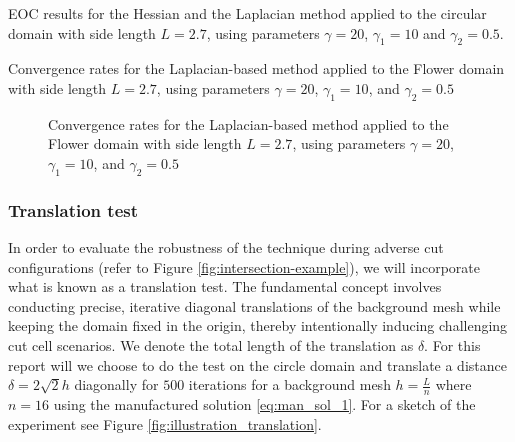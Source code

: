 \begin{table}

\begin{minipage}{1.0\textwidth}
    \centering
    \subfloat[Hessian]{}
\end{minipage}%

\bigskip
\begin{minipage}{1.0\textwidth}
    \centering
    \subfloat[Laplace]{}
\end{minipage}
\caption{EOC results for the Hessian and the Laplacian method applied to the circular domain with side length $L=2.7$, using parameters $\gamma=20$, $\gamma_1=10$ and $\gamma_2= 0.5$.}
\label{tab:conv_hes_lap}
\end{table}


\begin{table} 
\caption{Convergence rates for the Laplacian-based method applied to the Flower domain with side length $L=2.7$, using parameters $\gamma=20$, $\gamma_1=10$, and $\gamma_2= 0.5$}
\label{tab:conv_flower_lap}
\end{table}
\begin{figure}[h!]
    \centering

\caption{Convergence rates for the Laplacian-based method applied to the Flower domain with side length $L=2.7$, using parameters $\gamma=20$, $\gamma_1=10$, and $\gamma_2= 0.5$}
\label{fig:conv_flower_lap}
\end{figure}


\subsubsection{Translation test}%
\label{ssub:translation_test}

In order to evaluate the robustness of the technique during adverse cut configurations (refer to Figure \ref{fig:intersection-example}), we will incorporate what is known as a translation test. The fundamental concept involves conducting precise,
iterative diagonal translations of the background mesh while keeping the domain fixed in the origin, thereby intentionally inducing challenging cut cell scenarios. We denote the total length of the translation as $ \delta$. For this report will we
choose to do the test on the circle domain and translate a distance $\delta = 2\sqrt{2}h  $ diagonally for $500$ iterations for a background mesh $h = \frac{L}{n}$ where $n=16$ using the manufactured solution \eqref{eq:man_sol_1}. For a sketch of the experiment see Figure \ref{fig:illustration_translation}.

